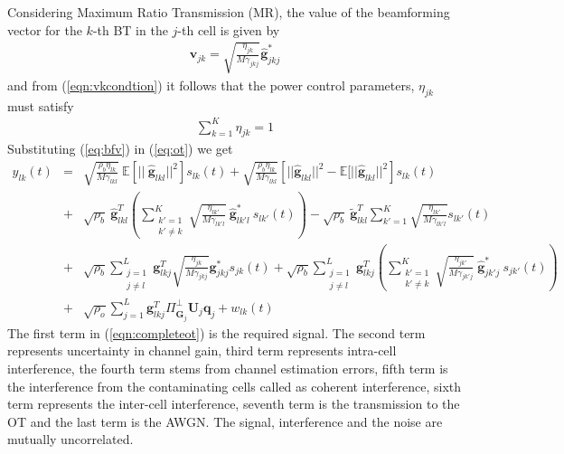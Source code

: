 \documentclass[10pt, a4paper, twoside,fleqn]{article}
\begin{document}
 Considering Maximum Ratio Transmission (MR), the value of the beamforming vector for the $k$-th BT in the $j$-th cell is given by
\begin{eqnarray}\label{eq:bfv}
	\pmb{v}_{jk} = \sqrt{\frac{\eta_{jk}}{M\gamma_{jkj}}}\pmb{\hat g}^*_{jkj}
\end{eqnarray}
and from (\ref{eqn:vkcondtion}) it follows that the power control parameters, $\eta_{jk}$ must satisfy
\begin{eqnarray}\label{eqn:etaconstraint}
\sum\limits_{k=1}^{K}\eta_{jk}=1
\end{eqnarray}
Substituting (\ref{eq:bfv}) in (\ref{eq:ot}) we get
\begin{eqnarray} \label{eqn:completeot}
	y_{lk}(t)  &=& \sqrt{\frac{\rho_b\eta_{lk}}{M\gamma_{lkl}}} \ \mathbb{E}[|| \ \pmb{\hat g}_{lkl}||^2]s_{lk}(t)
	           +  \sqrt{\frac{\rho_b\eta_{lk}}{M\gamma_{lkl}}}\left[||\pmb{\hat g}_{lkl}||^2 - \mathbb{E}[||\pmb{\hat g}_{lkl}||^2\right]s_{lk}(t)  \nonumber \\
	           &+& \sqrt{\rho_b} \ \pmb{\hat g}_{lkl}^T \left(\sum_{\substack{k'=1 \\ k' \neq k}}^{K} \sqrt{\frac{\eta_{lk'}}{M\gamma_{lk'l}}} \ \pmb{\hat g}^*_{lk'l} \ s_{lk'} (t)\right)
	           - \sqrt{\rho_b}\ \pmb{\widetilde g}^T_{lkl}\sum\limits_{k'=1}^{K}\sqrt{\frac{\eta_{lk'}}{M\gamma_{lk'l}}}s_{lk'}(t) \nonumber \\
	           &+& \sqrt{\rho_b}\sum\limits_{\substack{j=1 \\ j\neq l}}^{L}\pmb{g}^T_{lkj}\sqrt{\frac{\eta_{jk}}{M\gamma_{jkj}}}\pmb{g}^*_{jkj}s_{jk}(t)
               + \sqrt{\rho_b} \sum_{\substack{j=1 \\ j \neq l}}^{L} \pmb{g}_{lkj}^T \left(\sum_{\substack{k'=1 \\ k' \neq k}}^{K} \sqrt{\frac{\eta_{jk'}}{M\gamma_{jk'j}}} \ \pmb{\hat g}^*_{jk'j} \ s_{jk'} (t)\right)
               \nonumber \\
               &+& \sqrt{\rho_o}\sum_{j=1}^{L}\pmb{g}^T_{lkj} \Pi^{\perp}_{\pmb{\hat{G}}_j} \pmb{U}_j \pmb{q}_{j}
               + w_{lk}(t)      
\end{eqnarray}
The first term in (\ref{eqn:completeot}) is the required signal. The second term represents uncertainty in channel gain, third term represents intra-cell interference, the fourth term stems from channel estimation errors, fifth term is the  interference from the contaminating cells called as coherent interference, sixth term represents the inter-cell interference, seventh term is the transmission to the OT and the last term is the AWGN. The signal, interference and the noise are mutually uncorrelated.
\end{document}
